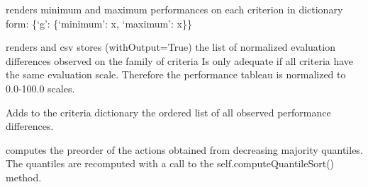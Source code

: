 \documentclass[letterpaper,10pt,english]{sphinxmanual}
\begin{document}
\begin{fulllineitems}
\begin{fulllineitems}
\end{fulllineitems}


\begin{fulllineitems}
\label{techDoc:perfTabs.PerformanceTableau.computeMinMaxEvaluations}
renders minimum and maximum performances on each criterion
in dictionary form: \{`g': \{`minimum': x, `maximum': x\}\}

\end{fulllineitems}


\begin{fulllineitems}
\label{techDoc:perfTabs.PerformanceTableau.computeNormalizedDiffEvaluations}
renders and csv stores (withOutput=True) the
list of normalized evaluation differences observed on the family of criteria
Is only adequate if all criteria have the same
evaluation scale. Therefore the performance tableau is normalized to 0.0-100.0 scales.

\end{fulllineitems}


\begin{fulllineitems}
\label{techDoc:perfTabs.PerformanceTableau.computePerformanceDifferences}
Adds to the criteria dictionary the ordered list of all observed performance differences.

\end{fulllineitems}


\begin{fulllineitems}
\label{techDoc:perfTabs.PerformanceTableau.computeQuantilePreorder}
computes the preorder of the actions obtained from decreasing majority quantiles. The quantiles are recomputed with a call to the self.computeQuantileSort() method.


\end{fulllineitems}
\end{fulllineitems}
\end{document}
